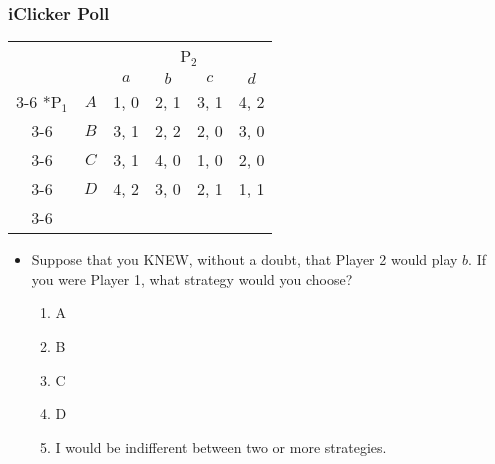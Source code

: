 
\begin{frame}
\frametitle{iClicker Poll}
\begin{table}[h]
	\centering
	\begin{tabular}{cc|c|c|c|c|}
		& \multicolumn{1}{c}{} & \multicolumn{4}{c}{P$_2$}\\
		& \multicolumn{1}{c}{} & \multicolumn{1}{c}{$a$} & \multicolumn{1}{c}{$b$} & \multicolumn{1}{c}{$c$} & \multicolumn{1}{c}{$d$} \\\cline{3-6}
		\multirow{4}*{P$_1$}  & $A$ & 1, 0 & 2, 1 & 3, 1 & 4, 2 \\\cline{3-6}
		& $B$ & 3, 1 & 2, 2 & 2, 0 & 3, 0 \\\cline{3-6}
		& $C$ & 3, 1 & 4, 0 & 1, 0 & 2, 0 \\\cline{3-6}
		& $D$ & 4, 2 & 3, 0 & 2, 1 & 1, 1 \\\cline{3-6}
	\end{tabular}
\end{table}
\begin{itemize}
	\item Suppose that you KNEW, without a doubt, that Player 2 would play $b$. If you were Player 1, what strategy would you choose?
	\begin{enumerate}
		\item A
		\item B
		\item C
		\item D
		\item I would be indifferent between two or more strategies.
	\end{enumerate}
\end{itemize}
\end{frame}

